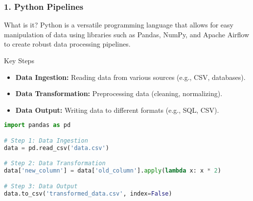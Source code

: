 \documentclass[aspectratio=169]{beamer}
\begin{document}
\begin{frame}[fragile]
    \frametitle{1. Python Pipelines}
    \begin{block}{What is it?}
        Python is a versatile programming language that allows for easy manipulation of data using libraries such as Pandas, NumPy, and Apache Airflow to create robust data processing pipelines.
    \end{block}
    
    \begin{block}{Key Steps}
        \begin{itemize}
            \item \textbf{Data Ingestion:} Reading data from various sources (e.g., CSV, databases).
            \item \textbf{Data Transformation:} Preprocessing data (cleaning, normalizing).
            \item \textbf{Data Output:} Writing data to different formats (e.g., SQL, CSV).
        \end{itemize}
    \end{block}
    
    \begin{lstlisting}[language=Python]
import pandas as pd

# Step 1: Data Ingestion
data = pd.read_csv('data.csv')

# Step 2: Data Transformation
data['new_column'] = data['old_column'].apply(lambda x: x * 2)

# Step 3: Data Output
data.to_csv('transformed_data.csv', index=False)
    \end{lstlisting}
\end{frame}
\end{document}
